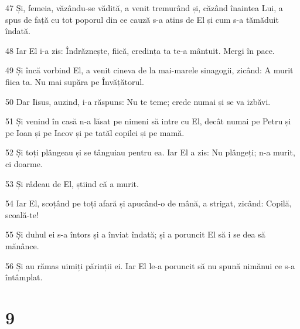 \par 47 Și, femeia, văzându-se vădită, a venit tremurând și, căzând înaintea Lui, a spus de față cu tot poporul din ce cauză s-a atins de El și cum s-a tămăduit îndată.
\par 48 Iar El i-a zis: Îndrăznește, fiică, credința ta te-a mântuit. Mergi în pace.
\par 49 Și încă vorbind El, a venit cineva de la mai-marele sinagogii, zicând: A murit fiica ta. Nu mai supăra pe Învățătorul.
\par 50 Dar Iisus, auzind, i-a răspuns: Nu te teme; crede numai și se va izbăvi.
\par 51 Și venind în casă n-a lăsat pe nimeni să intre cu El, decât numai pe Petru și pe Ioan și pe Iacov și pe tatăl copilei și pe mamă.
\par 52 Și toți plângeau și se tânguiau pentru ea. Iar El a zis: Nu plângeți; n-a murit, ci doarme.
\par 53 Și râdeau de El, știind că a murit.
\par 54 Iar El, scoțând pe toți afară și apucând-o de mână, a strigat, zicând: Copilă, scoală-te!
\par 55 Și duhul ei s-a întors și a înviat îndată; și a poruncit El să i se dea să mănânce.
\par 56 Și au rămas uimiți părinții ei. Iar El le-a poruncit să nu spună nimănui ce s-a întâmplat.

\chapter{9}

